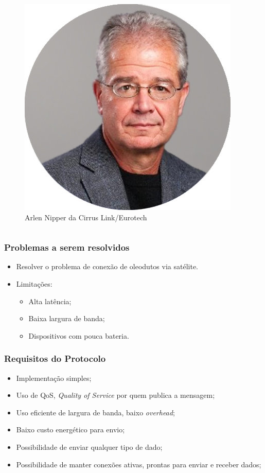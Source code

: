 \documentclass[12pt]{beamer}
\begin{document}
\begin{frame}
\begin{columns}[c]
\begin{column}{.5\textwidth}
\begin{figure}[!htb]
                \includegraphics[width=.77\textwidth]{arlen_nipper1}
                \caption{\label{fig:arlen}Arlen Nipper da Cirrus Link/Eurotech}
            \end{figure}
        \end{column}
    \end{columns}
\end{frame}

\begin{frame}
    \frametitle{Problemas a serem resolvidos}
    \begin{itemize}
        \item Resolver o problema de conexão de oleodutos via satélite.
        \item Limitações:
            \begin{itemize}
                \item Alta latência;
                \item Baixa largura de banda;
                \item Dispositivos com pouca bateria.
            \end{itemize}
    \end{itemize}
        
\end{frame}

\begin{frame}
    \frametitle{Requisitos do Protocolo}
    \begin{itemize}
        \item Implementação simples;
        \item Uso de QoS, \textit{Quality of Service} por quem publica a mensagem;
        \item Uso eficiente de largura de banda, baixo \textit{overhead};
        \item Baixo custo energético para envio;
        \item Possibilidade de enviar qualquer tipo de dado;
        \item Possibilidade de manter conexões ativas, prontas para enviar e receber dados;
    \end{itemize}
\end{frame}
\end{document}
